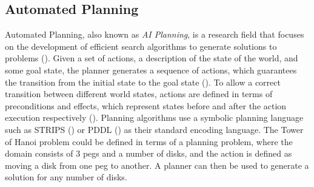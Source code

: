 \subsection{Automated Planning}
Automated Planning, also known as \textit{AI Planning}, is a research field that focuses on the development of efficient search algorithms to generate solutions to problems (\cite{ghallab2004automated}).
Given a set of actions, a description of the state of the world, and some goal state, the planner generates a sequence of actions, which guarantees the transition from the initial state to the goal state ().
To allow a correct transition between different world states, actions are defined in terms of preconditions and effects, which represent states before and after the action execution respectively ().
Planning algorithms use a symbolic planning language such as STRIPS (\cite{fikes1971strips}) or PDDL (\cite{ghallab2004automated}) as their standard encoding language.
The Tower of Hanoi problem could be defined in terms of a planning problem, where the domain consists of 3 pegs and a number of disks, and the action is defined as moving a disk from one peg to another.
A planner can then be used to generate a solution for any number of disks.


